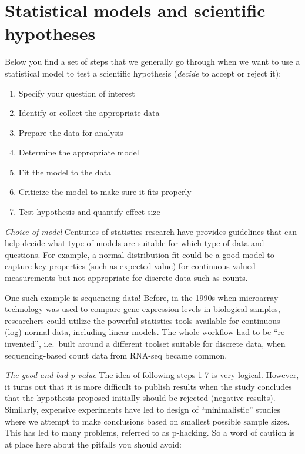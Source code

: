 \documentclass[
]{book}
\providecommand{\tightlist}{%
  \setlength{\itemsep}{0pt}\setlength{\parskip}{0pt}}
\begin{document}
\hypertarget{statistical-models-and-scientific-hypotheses}{%
\section{Statistical models and scientific hypotheses}\label{statistical-models-and-scientific-hypotheses}}

Below you find a set of steps that we generally go through when we want to use a statistical model to test a scientific hypothesis (\emph{decide} to accept or reject it):

\begin{enumerate}
\def\labelenumi{\arabic{enumi}.}
\tightlist
\item
  Specify your question of interest
\item
  Identify or collect the appropriate data
\item
  Prepare the data for analysis
\item
  Determine the appropriate model
\item
  Fit the model to the data
\item
  Criticize the model to make sure it fits properly
\item
  Test hypothesis and quantify effect size
\end{enumerate}

\emph{Choice of model} Centuries of statistics research have provides guidelines that can help decide what type of models are suitable for which type of data and questions. For example, a normal distribution fit could be a good model to capture key properties (such as expected value) for continuous valued measurements but not appropriate for discrete data such as counts.

One such example is sequencing data! Before, in the 1990s when microarray technology was used to compare gene expression levels in biological samples, researchers could utilize the powerful statistics tools available for continuous (log)-normal data, including linear models. The whole workflow had to be ``re-invented'', i.e.~built around a different toolset suitable for discrete data, when sequencing-based count data from RNA-seq became common.

\emph{The good and bad p-value} The idea of following steps 1-7 is very logical. However, it turns out that it is more difficult to publish results when the study concludes that the hypothesis proposed initially should be rejected (negative results). Similarly, expensive experiments have led to design of ``minimalistic'' studies where we attempt to make conclusions based on smallest possible sample sizes. This has led to many problems, referred to as p-hacking. So a word of caution is at place here about the pitfalls you should avoid:
\end{document}
